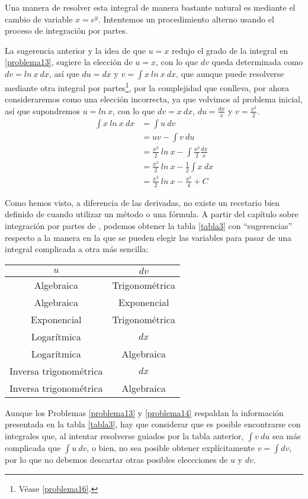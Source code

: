 \begin{problema}[$\int\:x\:ln\:x$]\label{problema14}
	Una manera de resolver esta integral de manera bastante natural es mediante el cambio de variable $x=e^y$. Intentemos un procedimiento alterno usando el proceso de integración por partes.
	
	La sugerencia anterior y la idea de que $u=x$ redujo el grado de la integral en \cref{problema13}, sugiere la elección de $u=x$, con lo que $dv$ queda determinada como $dv=ln\:x\:dx$, así que $du=dx$ y $v=\int x\:ln\:x\:dx$, que aunque puede resolverse mediante otra integral por partes\footnote{Véase \cref{problema16}.}, por la complejidad que conlleva, por ahora consideraremos como una elección incorrecta, ya que volvimos al problema inicial, así que supondremos $u=ln\:x$, con lo que $dv=x\:dx$, $du=\frac{dx}{x}$ y $v=\frac{x^2}{2}$.
	\begin{align*}
		\int x\:ln\:x\:dx&=\int u\:dv\\
					&=uv-\int v\:du\\
					&=\frac{x^2}{2}\:ln\:x-\int \frac{x^2}{2}\frac{dx}{x}\\
					&=\frac{x^2}{2}\:ln\:x-\frac{1}{2}\int x\:dx\\
					&=\frac{x^2}{2}\:ln\:x-\frac{x^2}{4}+C
	\end{align*}
\end{problema}

Como hemos visto, a diferencia de las derivadas, no existe un recetario bien definido de cuando utilizar un método o una fórmula. A partir del capítulo sobre integración por partes de \cite{simplificadas}, podemos obtener la tabla \ref{tabla3} con ``sugerencias'' respecto a la manera en la que se pueden elegir las variables para pasar de una integral complicada a otra más sencilla:
\begin{center}
	\begin{tabular}{|c|c|}
		\hline
		$u$&$dv$\\
		\hline
		Algebraica&Trigonométrica\\
		Algebraica&Exponencial\\
		Exponencial&Trigonométrica\\
		Logarítmica&$dx$\\
		Logarítmica&Algebraica\\
		Inversa trigonométrica&$dx$\\
		Inversa trigonométrica&Algebraica\\
		\hline
	\end{tabular}\label{tabla3}
\end{center}
Aunque los Problemas \ref{problema13} y \ref{problema14} respaldan la información presentada en la tabla \ref{tabla3}, hay que considerar que es posible encontrarse con integrales que, al intentar resolverse guiados por la tabla anterior, $\int v \:du$ sea más complicada que $\int u\:dv$, o bien, no sea posible obtener explícitamente $v=\int dv$, por lo que no debemos descartar otras posibles eleccciones de $u$ y $dv$.

